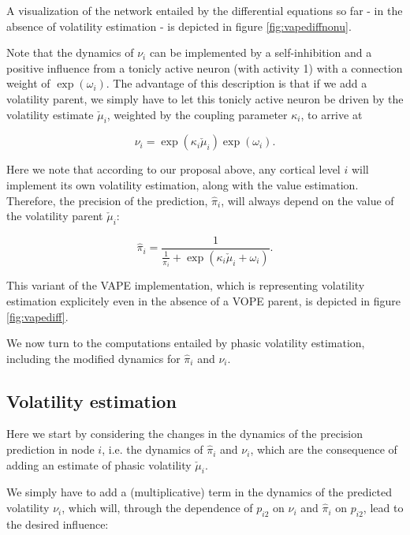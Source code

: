 
A visualization of the network entailed by the differential equations so far - in the absence of volatility estimation - is depicted in figure \ref{fig:vapediffnonu}.

Note that the dynamics of $\nu_i$ can be implemented by a self-inhibition and a positive influence from a tonicly active neuron (with activity 1) with a connection weight of $\exp(\omega_i)$. The advantage of this description is that if we add a volatility parent, we simply have to let this tonicly active neuron be driven by the volatility estimate $\check{\mu}_i$, weighted by the coupling parameter $\kappa_i$, to arrive at 

\begin{equation}
	\nu_i = \exp(\kappa_i \check{\mu}_i) \exp(\omega_i).
\end{equation}

Here we note that according to our proposal above, any cortical level $i$ will implement its own volatility estimation, along with the value estimation. Therefore, the precision of the prediction, $\hat{\pi}_i$, will always depend on the value of the volatility parent $\check{\mu}_i$:

\begin{equation}
	\hat{\pi}_i = \frac{1}{\frac{1}{\pi_i} + \exp(\kappa_i \check{\mu}_i + \omega_i)}.
\end{equation}


This variant of the \textsf{VAPE} implementation, which is representing volatility estimation explicitely even in the absence of a \textsf{VOPE} parent, is depicted in figure \ref{fig:vapediff}.

We now turn to the computations entailed by phasic volatility estimation, including the modified dynamics for $\hat{\pi}_i$ and $\nu_i$. 

\subsection{Volatility estimation}

Here we start by considering the changes in the dynamics of the precision prediction in node $i$, i.e. the dynamics of $\hat{\pi}_i$ and $\nu_i$, which are the consequence of adding an estimate of phasic volatility $\check{\mu}_i$.

We simply have to add a (multiplicative) term in the dynamics of the predicted volatility $\nu_i$, which will, through the dependence of $p_{i2}$ on $\nu_i$ and $\hat{\pi}_i$ on $p_{i2}$, lead to the desired influence:

